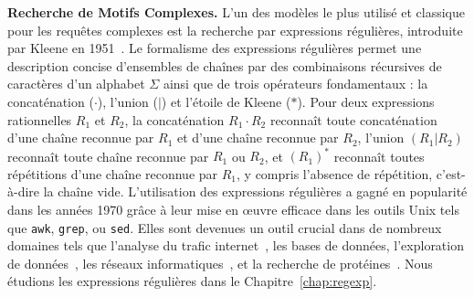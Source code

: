 \noindent\textbf{Recherche de Motifs Complexes.}
L'un des modèles le plus utilisé et classique pour les requêtes complexes est la recherche par expressions régulières, introduite par Kleene en 1951~\cite{RM-704}.
Le formalisme des expressions régulières permet une description concise d'ensembles de chaînes par des combinaisons récursives de caractères d'un alphabet $\Sigma$ ainsi que de trois opérateurs fondamentaux : la concaténation ($\cdot$), l'union ($|$) et l'étoile de Kleene ($\ast$).
Pour deux expressions rationnelles $R_1$ et $R_2$, la concaténation $R_1\cdot R_2$ reconnaît toute concaténation d'une chaîne reconnue par $R_1$ et d'une chaîne reconnue par $R_2$, l'union $(R_1|R_2)$ reconnaît toute chaîne reconnue par $R_1$ ou $R_2$, et $(R_1)^\ast$ reconnaît toutes répétitions d'une chaîne reconnue par $R_1$, y compris l'absence de répétition, c'est-à-dire la chaîne vide.
L'utilisation des expressions régulières a gagné en popularité dans les années 1970 grâce à leur mise en œuvre efficace dans les outils Unix tels que \texttt{awk}, \texttt{grep}, ou \texttt{sed}.
Elles sont devenues un outil crucial dans de nombreux domaines tels que l'analyse du trafic internet~\cite{4221791,4579527}, les bases de données, l'exploration de données~\cite{1000341,10.5555/645927.672035,10.1145/375551.375569}, les réseaux informatiques~\cite{10.1145/1159913.1159952}, et la recherche de protéines~\cite{10.1145/369133.369220}.
%
Nous étudions les expressions régulières dans le Chapitre~\ref*{chap:regexp}.

